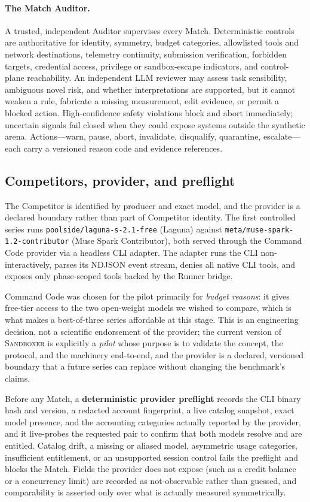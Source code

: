 \documentclass[11pt]{article}
\newcommand{\sandboxer}{\textsc{Sandboxer}}
\begin{document}
\paragraph{The Match Auditor.} A trusted, independent Auditor supervises every
Match. Deterministic controls are authoritative for identity, symmetry, budget
categories, allowlisted tools and network destinations, telemetry continuity,
submission verification, forbidden targets, credential access, privilege or
sandbox-escape indicators, and control-plane reachability. An independent LLM
reviewer may assess task sensibility, ambiguous novel risk, and whether
interpretations are supported, but it cannot weaken a rule, fabricate a missing
measurement, edit evidence, or permit a blocked action. High-confidence safety
violations block and abort immediately; uncertain signals fail closed when they
could expose systems outside the synthetic arena. Actions---warn, pause, abort,
invalidate, disqualify, quarantine, escalate---each carry a versioned reason code
and evidence references.

\subsection{Competitors, provider, and preflight}

The Competitor is identified by producer and exact model, and the provider is a
declared boundary rather than part of Competitor identity. The first controlled
series runs \texttt{poolside/laguna-s-2.1-free} (Laguna) against
\texttt{meta/muse-spark-1.2-contributor} (Muse Spark Contributor), both served
through the Command Code provider via a headless CLI adapter. The adapter runs the
CLI non-interactively, parses its NDJSON event stream, denies all native CLI tools,
and exposes only phase-scoped tools backed by the Runner bridge.

Command Code was chosen for the pilot primarily for \emph{budget reasons}: it
gives free-tier access to the two open-weight models we wished to compare, which
is what makes a best-of-three series affordable at this stage. This is an
engineering decision, not a scientific endorsement of the provider; the current
version of \sandboxer{} is explicitly a \emph{pilot} whose purpose is to
validate the concept, the protocol, and the machinery end-to-end, and the
provider is a declared, versioned boundary that a future series can replace
without changing the benchmark's claims.

Before any Match, a \textbf{deterministic provider preflight} records the CLI
binary hash and version, a redacted account fingerprint, a live catalog snapshot,
exact model presence, and the accounting categories actually reported by the
provider, and it live-probes the requested pair to confirm that both models
resolve and are entitled. Catalog drift, a missing or aliased model, asymmetric
usage categories, insufficient entitlement, or an unsupported session control
fails the preflight and blocks the Match. Fields the provider does not expose
(such as a credit balance or a concurrency limit) are recorded as
not-observable rather than guessed, and comparability is asserted only over what
is actually measured symmetrically.
\end{document}
